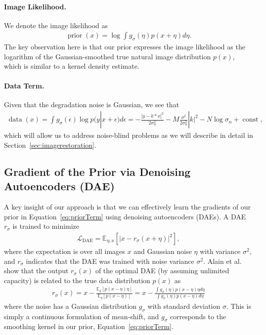 \documentclass{article}
\DeclareMathOperator*{\const}{const}
\DeclareMathOperator*{\data}{data}
\DeclareMathOperator*{\prior}{prior}
\begin{document}
\paragraph{Image Likelihood.}
We denote the image likelihood as
\begin{align}
\prior(x) = \log \int g_{\sigma}(\eta) p(x+\eta) d \eta.
\label{eq:priorTerm}
\end{align}
The key observation here is that our prior expresses the image likelihood as the logarithm of the Gaussian-smoothed true natural image distribution $p(x)$, which is similar to a kernel density estimate.

\paragraph{Data Term.}
Given that the degradation noise is Gaussian, we see that~\cite{Jin:2017:NBD}
\begin{align}
\data(x) = \int g_{\sigma}(\epsilon) \log p(y|x+\epsilon) d\epsilon 
 = -\frac{|y-k*x|^2}{2\sigma_n^2} - M \frac{\sigma^2}{2\sigma_n^2}|k|^2 - N \log{\sigma_n} + \const,
\label{eq:dataTerm}
\end{align}
which will allow us to address noise-blind problems as we will describe in detail in Section~\ref{sec:imagerestoration}.

\subsection{Gradient of the Prior via Denoising Autoencoders (DAE)}
\label{sec:dae}

A key insight of our approach is that we can effectively learn the gradients of our prior in Equation~\eqref{eq:priorTerm} using denoising autoencoders (DAEs). 
A DAE $r_{\sigma}$ is trained to minimize~\cite{Vincent:2008:ECR} 
\begin{align}
\mathcal{L}_{\text{DAE}} = \mathbb{E}_{\eta, x} \left[ |x - r_{\sigma}(x + \eta) |^2 \right],
\end{align}
where the expectation is over all images $x$ and Gaussian noise $\eta$ with variance $\sigma^2$, and $r_{\sigma}$ indicates that the DAE was trained with noise variance $\sigma^2$. 
Alain et al.~\cite{JMLR:v15:alain14a} show that the output $r_{\sigma}(x)$ of the optimal DAE (by assuming unlimited capacity) is related to the true data distribution $p(x)$ as
\begin{align}
\label{eq:meanshift}
r_{\sigma}(x) = x - \frac{\mathbb{E}_{\eta}\left[ p(x-\eta)\eta\right]}{\mathbb{E}_{\eta}\left[p(x-\eta)\right]}
= x - \frac{\int g_{\sigma}(\eta) p(x- \eta) \eta  d \eta}{\int g_{\sigma}(\eta) p(x- \eta) d \eta}
\end{align}
where the noise has a Gaussian distribution $g_{\sigma}$ with standard deviation $\sigma$. This is simply a continuous formulation of mean-shift, and $g_{\sigma}$ corresponds to the smoothing kernel in our prior, Equation~\eqref{eq:priorTerm}.
\end{document}
